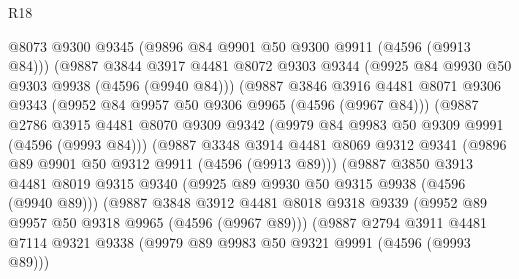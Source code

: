 \begin{lexlean}{R18}
\begin{coremodule}
                        @8073
                        @9300
                        @9345
                        (@9896 @84 @9901 @50 @9300 @9911 (@4596 (@9913 @84)))
                        (@9887
                          @3844
                          @3917
                          @4481
                          @8072
                          @9303
                          @9344
                          (@9925 @84 @9930 @50 @9303 @9938 (@4596 (@9940 @84)))
                          (@9887
                            @3846
                            @3916
                            @4481
                            @8071
                            @9306
                            @9343
                            (@9952 @84 @9957 @50 @9306 @9965 (@4596 (@9967 @84)))
                            (@9887
                              @2786
                              @3915
                              @4481
                              @8070
                              @9309
                              @9342
                              (@9979 @84 @9983 @50 @9309 @9991 (@4596 (@9993 @84)))
                              (@9887
                                @3348
                                @3914
                                @4481
                                @8069
                                @9312
                                @9341
                                (@9896 @89 @9901 @50 @9312 @9911 (@4596 (@9913 @89)))
                                (@9887
                                  @3850
                                  @3913
                                  @4481
                                  @8019
                                  @9315
                                  @9340
                                  (@9925 @89 @9930 @50 @9315 @9938 (@4596 (@9940 @89)))
                                  (@9887
                                    @3848
                                    @3912
                                    @4481
                                    @8018
                                    @9318
                                    @9339
                                    (@9952 @89 @9957 @50 @9318 @9965 (@4596 (@9967 @89)))
                                    (@9887
                                      @2794
                                      @3911
                                      @4481
                                      @7114
                                      @9321
                                      @9338
                                      (@9979 @89 @9983 @50 @9321 @9991 (@4596 (@9993 @89)))

\end{coremodule}
\end{lexlean}
